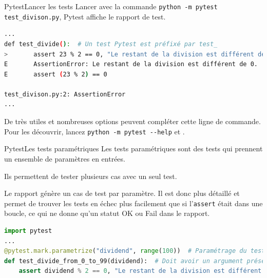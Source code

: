 \documentclass{beamer}
\begin{document}
    \begin{frame}[fragile]{Pytest}{Lancer les tests}
        \transdissolve
        Lancer avec la commande \lstinline{python -m pytest test_divison.py}, Pytest affiche le rapport de test.
        \begin{lstlisting}[language=sh]
...
def test_divide():  # Un test Pytest est préfixé par test_
>       assert 23 % 2 == 0, "Le restant de la division est différent de 0."
E       AssertionError: Le restant de la division est différent de 0.
E       assert (23 % 2) == 0

test_divison.py:2: AssertionError
...
        \end{lstlisting}

        De très utiles et nombreuses options peuvent compléter cette ligne de commande.
        Pour les découvrir, lancez \lstinline{python -m pytest --help} et .
    \end{frame}

    \begin{frame}[fragile]{Pytest}{Les tests paramétriques}
        \transdissolve
        Les tests paramétriques sont des tests qui prennent un ensemble de paramètres en entrées.

        Ils permettent de tester plusieurs cas avec un seul test.

        Le rapport génère un cas de test par paramètre.
        Il est donc plus détaillé et permet de trouver
        les tests en échec plus facilement que si l'\lstinline {assert} était dans une boucle, ce qui ne donne qu'un statut OK ou Fail dans le rapport.
        \begin{lstlisting}[language=Python]
import pytest
...
@pytest.mark.parametrize("dividend", range(100))  # Paramétrage du test
def test_divide_from_0_to_99(dividend):  # Doit avoir un argument présent dans le paramétrage
    assert dividend % 2 == 0, "Le restant de la division est différent de 0."
        \end{lstlisting}
    \end{frame}
\end{document}
